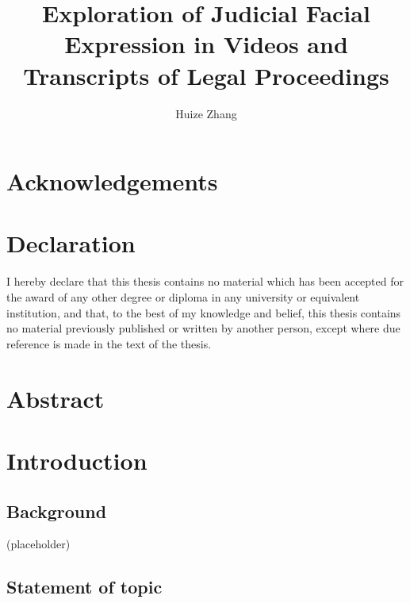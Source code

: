 \documentclass{monashthesis}
\author{Huize Zhang}
\title{Exploration of Judicial Facial Expression in Videos and Transcripts of Legal Proceedings}
\begin{document}

\titlepage

{\sf\tighttoc\doublespacing}

\clearpage{}\setcounter{page}{0}

\hypertarget{acknowledgements}{%
\chapter*{Acknowledgements}\label{acknowledgements}}

\hypertarget{declaration}{%
\chapter*{Declaration}\label{declaration}}

I hereby declare that this thesis contains no material which has been accepted for the award of any other degree or diploma in any university or equivalent institution, and that, to the best of my knowledge and belief, this thesis contains no material previously published or written by another person, except where due reference is made in the text of the thesis.

\vspace*{2cm}\par\authorname

\hypertarget{abstract}{%
\chapter*{Abstract}\label{abstract}}

\clearpage{}\setcounter{page}{1}

\hypertarget{ch:intro}{%
\chapter{Introduction}\label{ch:intro}}

\hypertarget{background}{%
\section{Background}\label{background}}

(placeholder)

\hypertarget{statement-of-topic}{%
\section{Statement of topic}\label{statement-of-topic}}
\end{document}
